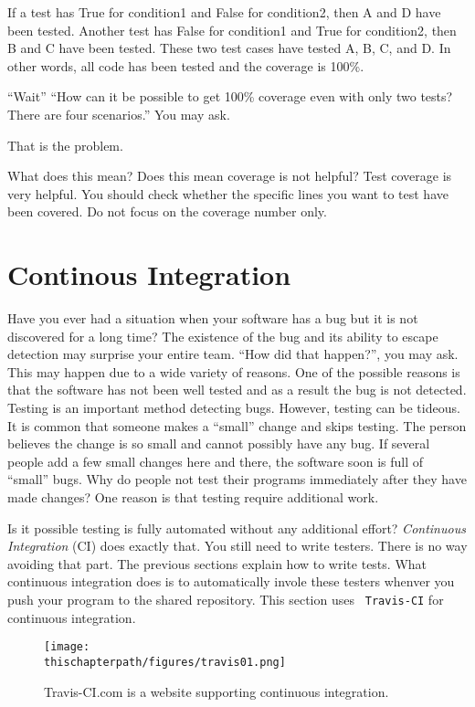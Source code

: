 {If a test has True for condition1 and False for condition2, then A and
D have been tested. Another test has False for condition1 and True for
condition2, then B and C have been tested.  These two test cases have
tested A, B, C, and D. In other words, all code has been tested and
the coverage is 100\%.

``Wait'' ``How can it be possible to get 100\% coverage even with only
two tests? There are four scenarios.'' You may ask.

That is the problem.

What does this mean? Does this mean coverage is not helpful? Test
coverage is very helpful.  You should check whether the specific lines
you want to test have been covered.  Do not focus on the coverage
number only.


\section{Continous Integration}

Have you ever had a situation when your software has a bug but it is
not discovered for a long time?  The existence of the bug and its
ability to escape detection may surprise your entire team. ``How did
that happen?'', you may ask.  This may happen due to a wide variety of
reasons. One of the possible reasons is that the software has not been
well tested and as a result the bug is not detected. Testing is an
important method detecting bugs.  However, testing can be tideous.  It
is common that someone makes a ``small'' change and skips testing.
The person believes the change is so small and cannot possibly have
any bug.  If several people add a few small changes here and there,
the software soon is full of ``small'' bugs.  Why do people not test
their programs immediately after they have made changes?  One reason
is that testing require additional work.

Is it possible testing is fully automated without any additional
effort? {\it Continuous Integration} (CI) does exactly that.  You
still need to write testers. There is no way avoiding that part.  The
previous sections explain how to write tests.  What continuous
integration does is to automatically invole these testers whenver you
push your program to the shared repository.  This section uses {\tt
  Travis-CI} for continuous integration. 


\begin{figure}[h] \centering
{\texttt{[image: \\thischapterpath/figures/travis01.png]}}
\caption{Travis-CI.com is a website supporting continuous integration.}
\label{fig:travis01}
\end{figure}

}
